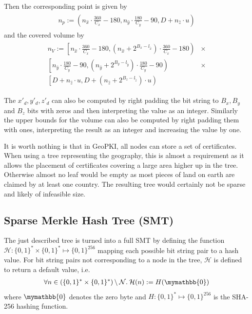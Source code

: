 \documentclass[10pt,conference,compsocconf]{IEEEtran}
\newcommand{\mathbbzero}{\mymathbb{0}}
\begin{document}
Then the corresponding point is given by
\begin{align}
\begin{split}
\label{eq:intermediate-geometric-point-partial-height}
n_p :=\left(
n_{\hat{x}} \cdot \frac{360}{C_x} - 180,
n_{\hat{y}} \cdot \frac{180}{C_y} - 90,
D + n_{\hat{z}} \cdot u
\right)
\end{split}
\end{align}
and the covered volume by
\begin{align}
\begin{split}
\label{eq:intermediate-geometric-volume-full-height}
n_V :=\left[
n_{\hat{x}} \cdot \frac{360}{C_x} - 180,
(n_{\hat{x}} + 2^{B_{x} - l_{\tilde{x}}}) \cdot \frac{360}{C_x} - 180
\right) &\times\\
\left[
n_{\hat{y}} \cdot \frac{180}{C_y} - 90,
(n_{\hat{y}} + 2^{B_{y} - l_{\tilde{y}}}) \cdot \frac{180}{C_y} - 90
\right) &\times\\
\left[
D + n_{\hat{z}} \cdot u,
D + \left(n_{\hat{z}} + 2^{B_z - l_{\tilde{z}}}
\right) \cdot u\right)&
\end{split}
\end{align}

The $x'_d, y'_d, z'_d$ can also be computed by right padding the bit string to $B_x, B_y$ and $B_z$ bits with zeros and then interpreting the value as an integer.
Similarly the upper bounds for the volume can also be computed by right padding them with ones, interpreting the result as an integer and increasing the value by one.

It is worth nothing is that in GeoPKI, all nodes can store a set of certificates.
When using a tree representing the geography, this is almost a requirement as it allows the placement of certificates covering a large area higher up in the tree.
Otherwise almost no leaf would be empty as most pieces of land on earth are claimed by at least one country.
The resulting tree would certainly not be sparse and likely of infeasible size.

\subsection{Sparse Merkle Hash Tree (SMT)}
\label{sec:data-structure:SMT}

The just described tree is turned into a full SMT by defining the function $\mathcal{H}: \{0,1\}^{*} \times \{0,1\}^{*} \mapsto \{0,1\}^{256}$ mapping each possible bit string pair to a hash value.
For bit string pairs not corresponding to a node in the tree, $\mathcal{H}$ is defined to return a default value, i.e.
\begin{align}
	\forall n \in \left(\{0,1\}^{*} \times \{0,1\}^{*} \right) \backslash \: \mathcal{N}. \: \mathcal{H}(n) := H(\mathbbzero)
\end{align}
where $\mathbbzero$ denotes the zero byte and $H: \{0,1\}^{*} \mapsto \{0,1\}^{256}$ is the SHA-256 hashing function.
\end{document}
